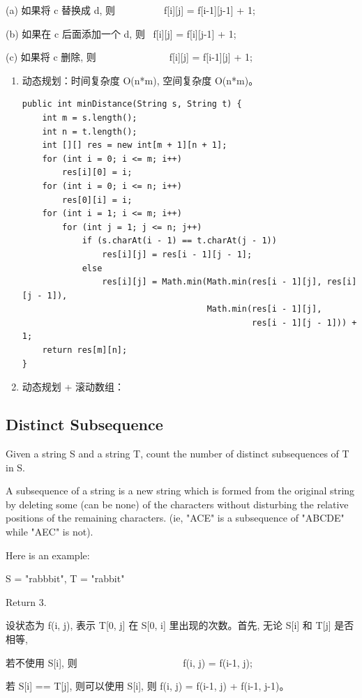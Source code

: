 \documentclass[12pt]{book}
\begin{document}
(a) 如果将 c 替换成 d, 则~ ~ ~ ~ ~ ~ f[i][j] = f[i-1][j-1] + 1;

(b) 如果在 c 后面添加一个 d, 则~ f[i][j] = f[i][j-1] + 1;

(c) 如果将 c 删除, 则~ ~ ~ ~ ~ ~ ~ ~ ~ f[i][j] = f[i-1][j] + 1;

\begin{enumerate}
\item 动态规划：时间复杂度 O(n*m), 空间复杂度 O(n*m)。
\label{sec-14-3-4-1}
\lstset{language=java,label= ,caption= ,numbers=none}
\begin{lstlisting}
public int minDistance(String s, String t) {
    int m = s.length();
    int n = t.length();
    int [][] res = new int[m + 1][n + 1];
    for (int i = 0; i <= m; i++)
        res[i][0] = i;
    for (int i = 0; i <= n; i++)
        res[0][i] = i;
    for (int i = 1; i <= m; i++) 
        for (int j = 1; j <= n; j++) 
            if (s.charAt(i - 1) == t.charAt(j - 1))
                res[i][j] = res[i - 1][j - 1];
            else 
                res[i][j] = Math.min(Math.min(res[i - 1][j], res[i][j - 1]),
                                     Math.min(res[i - 1][j],
                                              res[i - 1][j - 1])) + 1;
    return res[m][n];
}
\end{lstlisting}
\item 动态规划 + 滚动数组：
\label{sec-14-3-4-2}
\end{enumerate}

\subsection{Distinct Subsequence}
\label{sec-14-3-5}
Given a string S and a string T, count the number of distinct subsequences of T in S.

A subsequence of a string is a new string which is formed from the original string by deleting some (can be none) of the characters without disturbing the relative positions of the remaining characters. (ie, "ACE" is a subsequence of "ABCDE" while "AEC" is not).

Here is an example:

S = "rabbbit", T = "rabbit"

Return 3.

设状态为 f(i, j), 表示 T[0, j] 在 S[0, i] 里出现的次数。首先, 无论 S[i] 和 T[j] 是否相等, 

若不使用 S[i], 则~ ~ ~ ~ ~ ~ ~ ~ ~ ~ ~ ~ ~ f(i, j) = f(i-1, j); 

若 S[i] == T[j], 则可以使用 S[i], 则 f(i, j) = f(i-1, j) + f(i-1, j-1)。
\end{document}
